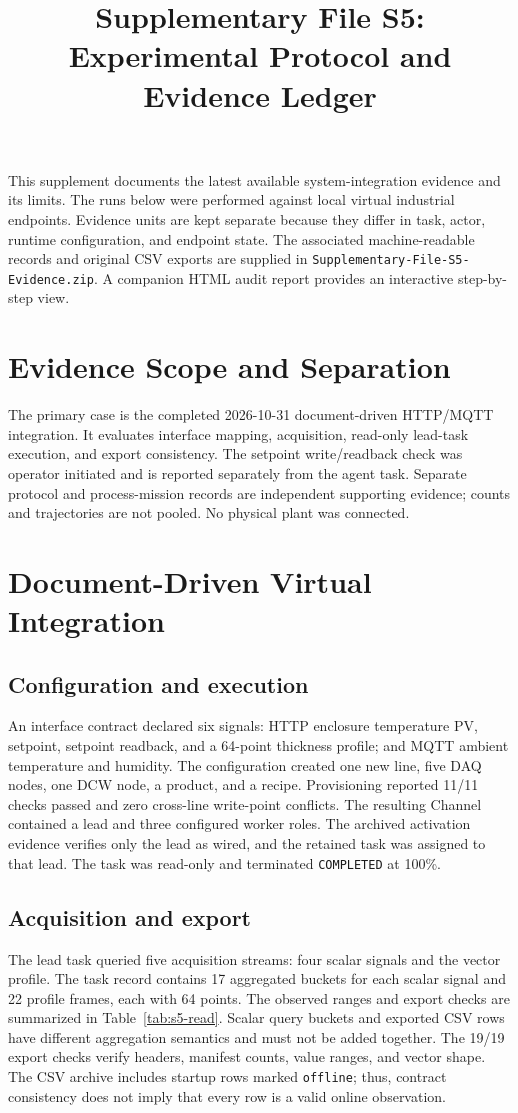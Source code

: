 \documentclass[journal]{IEEEtran}
\title{Supplementary File S5: Experimental Protocol and Evidence Ledger}
\author{}
\begin{document}
\maketitle

\noindent This supplement documents the latest available system-integration
evidence and its limits. The runs below were performed against local virtual
industrial endpoints. Evidence units are kept separate because they differ in
task, actor, runtime configuration, and endpoint state. The associated
machine-readable records and original CSV exports are supplied in
\texttt{Supplementary-File-S5-Evidence.zip}. A companion HTML audit report
provides an interactive step-by-step view.

\section{Evidence Scope and Separation}
The primary case is the completed 2026-10-31 document-driven HTTP/MQTT
integration. It evaluates interface mapping, acquisition, read-only lead-task
execution, and export consistency. The setpoint write/readback check was
operator initiated and is reported separately from the agent task. Separate
protocol and process-mission records are independent
supporting evidence; counts and trajectories are not pooled. No physical plant
was connected.

\section{Document-Driven Virtual Integration}
\subsection{Configuration and execution}
An interface contract declared six signals: HTTP enclosure temperature PV,
setpoint, setpoint readback, and a 64-point thickness profile; and MQTT
ambient temperature and humidity. The configuration created one new line,
five DAQ nodes, one DCW node, a product, and a recipe. Provisioning reported
11/11 checks passed and zero cross-line write-point conflicts. The resulting
Channel contained a lead and three configured worker roles. The archived
activation evidence verifies only the lead as wired, and the retained task
was assigned to that lead. The task was read-only and terminated
\texttt{COMPLETED} at 100\%.

\subsection{Acquisition and export}
The lead task queried five acquisition streams: four scalar signals and the
vector profile. The task record contains 17 aggregated buckets for each scalar
signal and 22 profile frames, each with 64 points. The observed ranges and
export checks are summarized in Table~\ref{tab:s5-read}. Scalar query buckets
and exported CSV rows have different aggregation semantics and must not be
added together. The 19/19 export checks verify headers, manifest counts, value
ranges, and vector shape. The CSV archive includes startup rows marked
\texttt{offline}; thus, contract consistency does not imply that every row is
a valid online observation.
\end{document}
